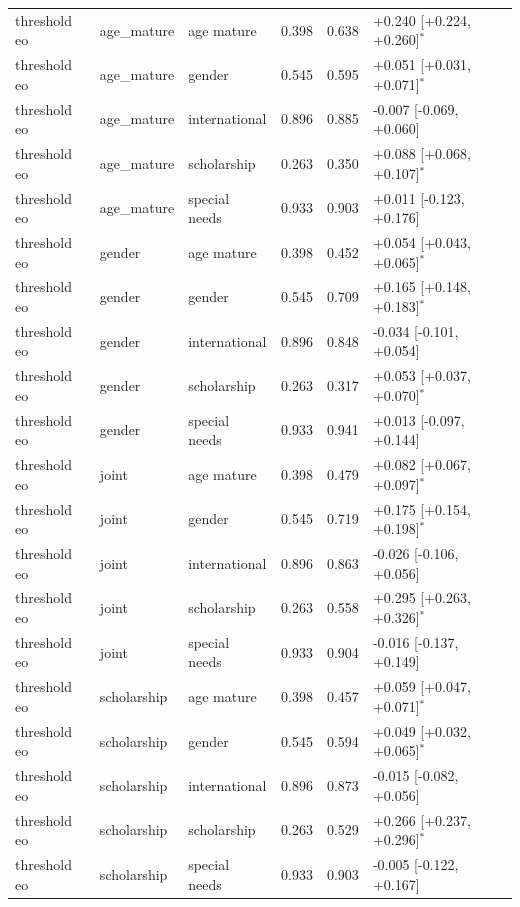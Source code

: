 \begin{table}[t]
\begin{tabular}{lllrrl}
threshold eo & age_mature & age mature & 0.398 & 0.638 & +0.240 [+0.224, +0.260]$^{*}$ \\
threshold eo & age_mature & gender & 0.545 & 0.595 & +0.051 [+0.031, +0.071]$^{*}$ \\
threshold eo & age_mature & international & 0.896 & 0.885 & -0.007 [-0.069, +0.060] \\
threshold eo & age_mature & scholarship & 0.263 & 0.350 & +0.088 [+0.068, +0.107]$^{*}$ \\
threshold eo & age_mature & special needs & 0.933 & 0.903 & +0.011 [-0.123, +0.176] \\
threshold eo & gender & age mature & 0.398 & 0.452 & +0.054 [+0.043, +0.065]$^{*}$ \\
threshold eo & gender & gender & 0.545 & 0.709 & +0.165 [+0.148, +0.183]$^{*}$ \\
threshold eo & gender & international & 0.896 & 0.848 & -0.034 [-0.101, +0.054] \\
threshold eo & gender & scholarship & 0.263 & 0.317 & +0.053 [+0.037, +0.070]$^{*}$ \\
threshold eo & gender & special needs & 0.933 & 0.941 & +0.013 [-0.097, +0.144] \\
threshold eo & joint & age mature & 0.398 & 0.479 & +0.082 [+0.067, +0.097]$^{*}$ \\
threshold eo & joint & gender & 0.545 & 0.719 & +0.175 [+0.154, +0.198]$^{*}$ \\
threshold eo & joint & international & 0.896 & 0.863 & -0.026 [-0.106, +0.056] \\
threshold eo & joint & scholarship & 0.263 & 0.558 & +0.295 [+0.263, +0.326]$^{*}$ \\
threshold eo & joint & special needs & 0.933 & 0.904 & -0.016 [-0.137, +0.149] \\
threshold eo & scholarship & age mature & 0.398 & 0.457 & +0.059 [+0.047, +0.071]$^{*}$ \\
threshold eo & scholarship & gender & 0.545 & 0.594 & +0.049 [+0.032, +0.065]$^{*}$ \\
threshold eo & scholarship & international & 0.896 & 0.873 & -0.015 [-0.082, +0.056] \\
threshold eo & scholarship & scholarship & 0.263 & 0.529 & +0.266 [+0.237, +0.296]$^{*}$ \\
threshold eo & scholarship & special needs & 0.933 & 0.903 & -0.005 [-0.122, +0.167] \\
\bottomrule
\end{tabular}
\end{table}